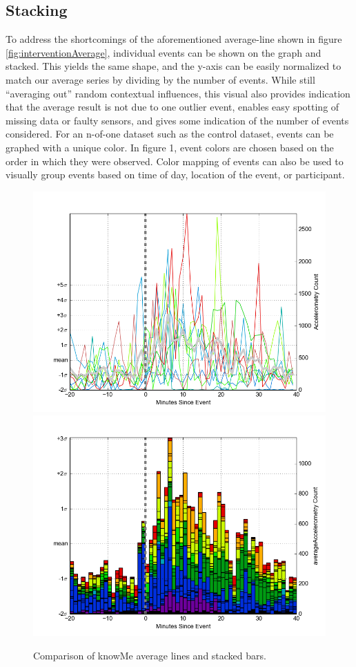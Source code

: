 \subsection{Stacking}
To address the shortcomings of the aforementioned average-line shown in figure \ref{fig:interventionAverage}, individual events can be shown on the graph and stacked.
This yields the same shape, and the y-axis can be easily normalized to match our average series by dividing by the number of events.
While still “averaging out” random contextual influences, this visual also provides indication that the average result is not due to one outlier event, enables easy spotting of missing data or faulty sensors, and gives some indication of the number of events considered.
For an n-of-one dataset such as the control dataset, events can be graphed with a unique color.
In figure 1, event colors are chosen based on the order in which they were observed.
Color mapping of events can also be used to visually group events based on time of day, location of the event, or participant.

\begin{figure}
\centering
\includegraphics[width=0.9\columnwidth]{./img/knowMe_60m_lines.png}
\includegraphics[width=0.9\columnwidth]{./img/knowMe_60m_bars.png}
\caption{Comparison of knowMe average lines and stacked bars.}
\label{fig:knowMeCompare}
\end{figure}

